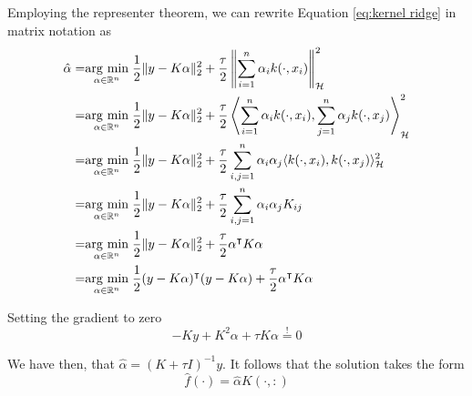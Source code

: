 Employing the representer theorem, we can rewrite Equation \ref{eq:kernel ridge} in matrix notation as
\begin{equation}
    \begin{aligned}
    \hat{\alpha}=&\underset{\alpha \in \mathbb{R}^n}{\operatorname{arg}\,\operatorname{min}}\;\frac{1}{2}\|y-K\alpha\|_2^2+\frac{\tau}{2}\left\|\sum _{i=1}^{n}\alpha _{i}k(\cdot ,x_{i})\right\|_{\mathcal{H}}^2
    \\
    =&\underset{\alpha \in \mathbb{R}^n}{\operatorname{arg}\,\operatorname{min}}\;\frac{1}{2}\|y-K\alpha\|_2^2+\frac{\tau}{2} \left\langle \sum _{i=1}^{n}\alpha _{i}k(\cdot ,x_{i}),\sum _{j=1}^{n}\alpha _{j}k(\cdot ,x_{j})\right\rangle_{\mathcal{H}}^2
    \\
    =&\underset{\alpha \in \mathbb{R}^n}{\operatorname{arg}\,\operatorname{min}}\;\frac{1}{2}\|y-K\alpha\|_2^2+\frac{\tau}{2} \sum _{i,j=1}^{n}\alpha _{i}\alpha _{j}\langle k(\cdot ,x_{i}),k(\cdot ,x_{j})\rangle_{\mathcal{H}}^2
    \\
    =&\underset{\alpha \in \mathbb{R}^n}{\operatorname{arg}\,\operatorname{min}}\;\frac{1}{2}\|y-K\alpha\|_2^2+\frac{\tau}{2} \sum _{i,j=1}^{n}\alpha _{i}\alpha _{j}K_{ij}
    \\
    =&\underset{\alpha \in \mathbb{R}^n}{\operatorname{arg}\,\operatorname{min}}\;\frac{1}{2}\|y-K\alpha\|_2^2+\frac{\tau}{2} \alpha^\intercal K \alpha
    \\
    =&\underset{\alpha \in \mathbb{R}^n}{\operatorname{arg}\,\operatorname{min}}\;\frac{1}{2}(y-K\alpha)^\intercal (y-K\alpha)+\frac{\tau}{2} \alpha^\intercal K \alpha
\end{aligned}
\end{equation}

Setting the gradient to zero
\begin{equation}
    -Ky+K^2\alpha+\tau K \alpha\overset{!}{=}0
\end{equation}

We have then, that $\hat{\alpha}=(K+\tau I)^{-1}y$. It follows that the solution takes the form
\begin{equation}
    \hat{f}(\cdot)=\hat{\alpha}K(\cdot,:)
\end{equation}

